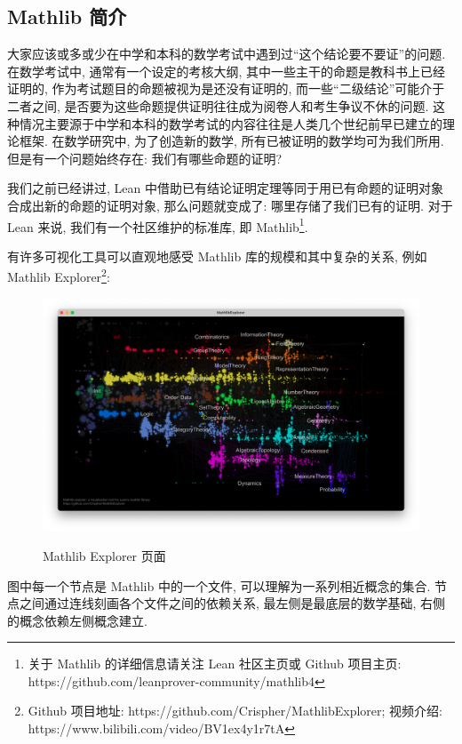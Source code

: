 \documentclass[UTF8]{ctexart}
\DeclareMathOperator{\0}{\mathbf{0}}                    %
\newcommand{\<}{\langle}
\renewcommand{\>}{\rangle}                              %
\theoremstyle{MyStyle} %
\begin{document}
    \subsection{Mathlib 简介}

        大家应该或多或少在中学和本科的数学考试中遇到过``这个结论要不要证''的问题. 在数学考试中, 通常有一个设定的考核大纲, 其中一些主干的命题是教科书上已经证明的, 作为考试题目的命题被视为是还没有证明的, 而一些``二级结论''可能介于二者之间, 是否要为这些命题提供证明往往成为阅卷人和考生争议不休的问题. 这种情况主要源于中学和本科的数学考试的内容往往是人类几个世纪前早已建立的理论框架. 在数学研究中, 为了创造新的数学, 所有已被证明的数学均可为我们所用. 但是有一个问题始终存在: 我们有哪些命题的证明? 

        我们之前已经讲过, Lean 中借助已有结论证明定理等同于用已有命题的证明对象合成出新的命题的证明对象, 那么问题就变成了: 哪里存储了我们已有的证明. 对于 Lean 来说, 我们有一个社区维护的标准库, 即 Mathlib\footnote{关于 Mathlib 的详细信息请关注 Lean 社区主页或 Github 项目主页: https://github.com/leanprover-community/mathlib4}. 
        
        有许多可视化工具可以直观地感受 Mathlib 库的规模和其中复杂的关系, 例如 Mathlib Explorer\footnote{Github 项目地址: https://github.com/Crispher/MathlibExplorer; 视频介绍: https://www.bilibili.com/video/BV1ex4y1r7tA}: 
        
        \begin{figure}[htbp]
            \centering
            \includegraphics[width=\textwidth]{figures/MathlibExplorer.png}\label{fig:MathlibExplorer}
            \caption{Mathlib Explorer 页面}
        \end{figure}

        图中每一个节点是 Mathlib 中的一个文件, 可以理解为一系列相近概念的集合. 节点之间通过连线刻画各个文件之间的依赖关系, 最左侧是最底层的数学基础, 右侧的概念依赖左侧概念建立. 
        
\end{document}
